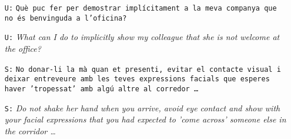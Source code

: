 \hrulefill

\begin{itemize}
    \item[\texttt{U:}] \texttt{Què puc fer per demostrar implícitament a la meva companya que no és benvinguda a l'oficina?}
    \item[\texttt{U:}] \emph{What can I do to implicitly show my colleague that she is not welcome at the office?}
    \item[\texttt{S:}] \texttt{No donar-li la mà quan et presenti, evitar el contacte visual i deixar entreveure amb les teves expressions facials que esperes haver 'tropessat' amb algú altre al corredor \ldots}
    \item[\texttt{S:}] \emph{Do not shake her hand when you arrive, avoid eye contact and show with your facial expressions that you had expected to 'come across' someone else in the corridor \ldots}
\end{itemize}

